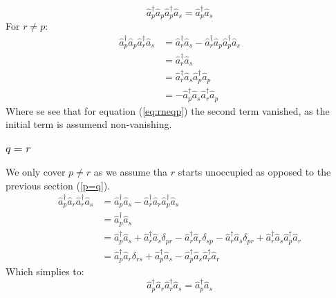 \documentclass[12p]{article}
\begin{document}
\begin{equation}
  \hat{a}^\dagger_p \hat{a}_p \hat{a}^\dagger_p \hat{a}_s = \hat{a}^\dagger_p \hat{a}_s
\end{equation}
For $r \neq p$:
\begin{align}
  \hat{a}^\dagger_p \hat{a}_p \hat{a}^\dagger_r \hat{a}_s & = \hat{a}^\dagger_r  \hat{a}_s - \hat{a}^\dagger_r \hat{a}_p \hat{a}^\dagger_p \hat{a}_s  \nonumber \\
  & = \hat{a}^\dagger_r  \hat{a}_s \label{eq:rneqp}\\
  & =  \hat{a}^\dagger_r \hat{a}_s \hat{a}^\dagger_p \hat{a}_p \\
  & = - \hat{a}^\dagger_p \hat{a}_s \hat{a}^\dagger_r \hat{a}_p
\end{align}
Where se see that for equation (\ref{eq:rneqp}) the second term vanished, as the initial term is assumend non-vanishing.

\subsubsection{$q=r$}
We only cover $p \neq r$ as we assume tha $r$ starts unoccupied as opposed to the previous section (\ref{p=q}).
\begin{align}
  \hat{a}^\dagger_p \hat{a}_r \hat{a}^\dagger_r \hat{a}_s & = \hat{a}^\dagger_p \hat{a}_s - \hat{a}^\dagger_r \hat{a}_r \hat{a}^\dagger_p \hat{a}_s \nonumber \\
  & = \hat{a}^\dagger_p \hat{a}_s  \\
  & = \hat{a}^\dagger_p \hat{a}_s + \hat{a}^\dagger_r \hat{a}_s \delta_{pr} - \hat{a}^\dagger_r \hat{a}_r  \delta_{sp} - \hat{a}^\dagger_r \hat{a}_s \delta_{pr} + \hat{a}^\dagger_r \hat{a}_s \hat{a}^\dagger_p \hat{a}_r \\
  & = \hat{a}^\dagger_p \hat{a}_r \delta_{rs} + \hat{a}^\dagger_p \hat{a}_s - \hat{a}^\dagger_p \hat{a}_s \hat{a}^\dagger_r \hat{a}_r
\end{align}
Which simplies to:
\begin{equation}
  \hat{a}^\dagger_p \hat{a}_r \hat{a}^\dagger_r \hat{a}_s = \hat{a}^\dagger_p \hat{a}_s
\end{equation}
\end{document}
